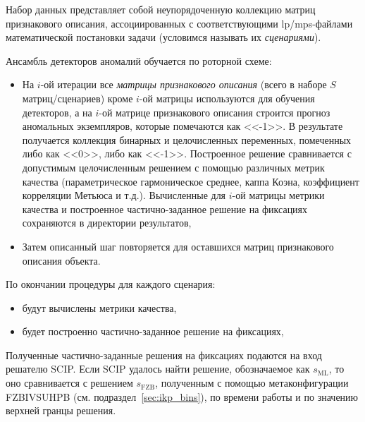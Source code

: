 \documentclass[%
	11pt,
	a4paper,
	utf8,
		]{article}
\begin{document}
Набор данных представляет собой неупорядоченную коллекцию матриц признакового описания, ассоциированных с соответствующими lp/mps-файлами математической постановки задачи (условимся называть их \emph{сценариями}).



Ансамбль детекторов аномалий обучается по роторной схеме:
\begin{itemize}
	\item На $ i $-ой итерации все \emph{матрицы признакового описания} (всего в наборе $ S $ матриц/сценариев) кроме $ i $-ой матрицы используются для обучения детекторов, а на $ i $-ой матрице признакового описания строится прогноз аномальных экземпляров, которые помечаются как <<-1>>. В результате получается коллекция бинарных и целочисленных переменных, помеченных либо как <<0>>, либо как <<-1>>. Построенное решение сравнивается с допустимым целочисленным решением с помощью различных метрик качества (параметрическое гармоническое среднее, каппа Коэна, коэффициент корреляции Метьюса и т.д.). Вычисленные для $ i $-ой матрицы метрики качества и построенное частично-заданное решение на фиксациях сохраняются в директории результатов,
	
	\item Затем описанный шаг повторяется для оставшихся матриц признакового описания объекта.
\end{itemize}

По окончании процедуры для каждого сценария:
\begin{itemize}
	\item будут вычислены метрики качества,
	
	\item будет построенно частично-заданное решение на фиксациях,
\end{itemize}

Полученные частично-заданные решения на фиксациях подаются на вход решателю SCIP. Если SCIP удалось найти решение, обозначаемое как $ s_{\text{ML}} $, то оно сравнивается с решением $ s_{\text{FZB}} $, полученным с помощью метаконфигурации FZBIVSUHPB (см. подраздел~\ref{sec:ikp_bins}), по времени работы и по значению верхней гранцы решения.

\end{document}
